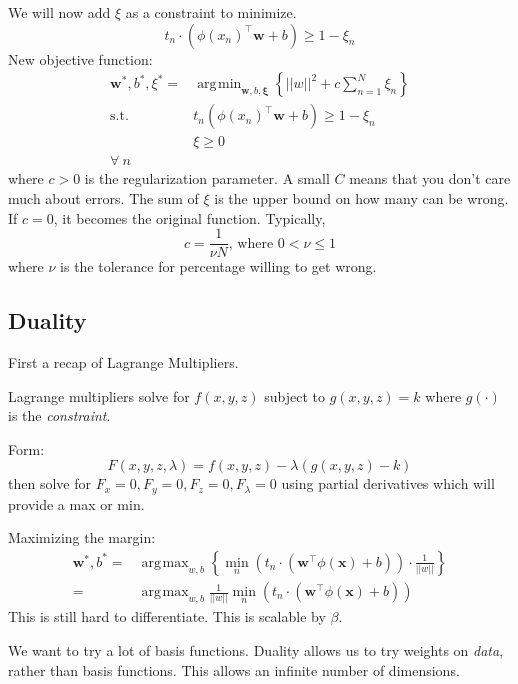 \documentclass[11pt, oneside]{article}   	%
\DeclareMathOperator*{\argmin}{\arg\!\min}
\DeclareMathOperator*{\argmax}{\arg\!\max}
\begin{document}
We will now add $\xi$ as a constraint to minimize.
\begin{equation}
t_n\cdot(\phi(x_n)^\intercal\mathbf{w}+b) \ge 1 - \xi_n
\end{equation}
New objective function:
\begin{align}
\mathbf{w}^*,b^*,\xi^*=& \argmin_{\mathbf{w},b,\mathbf{\xi}}\left\{||w||^2+ c \sum_{n=1}^{N}\xi_n\right\}\\
\text{s.t.} \:& t_n(\phi(x_n)^\intercal\mathbf{w} + b) \ge 1 -\xi_n\\
& \xi \ge 0\\
\forall \:n
\end{align}
where $c>0$ is the regularization parameter. A small $C$ means that you don't care much about errors. The sum of $\xi$ is the upper bound on how many can be wrong. If $c = 0$, it becomes the original function.
Typically,
\begin{equation}
c=\frac{1}{\nu N} \text{, where } 0 < \nu \le 1
\end{equation}
where $\nu$ is the tolerance for percentage willing to get wrong.

\subsection {Duality}
\begin{framed}
First a recap of Lagrange Multipliers.

Lagrange multipliers solve for $f(x,y,z)$ subject to $g(x,y,z) = k$ where $g(\cdot)$ is the \emph{constraint}.

Form:
\begin{equation}
F(x,y,z,\lambda) = f(x,y,z) - \lambda(g(x,y,z)-k)
\end{equation}
then solve for
$F_x = 0, F_y=0, F_z = 0, F_\lambda = 0$ using partial derivatives which will provide a max or min.
\end{framed}

Maximizing the margin:
\begin{align}
\mathbf{w}^*,b^*= &
\argmax_{w,b} \left\{\min_n(t_n\cdot(\mathbf{w}^\intercal\phi(\mathbf{x})+b))\cdot\frac{1}{||w||} \right\}\\
= &\argmax_{w,b} \frac{1}{||w||}\min_n(t_n\cdot(\mathbf{w}^\intercal\phi(\mathbf{x})+b))
\end{align}
This is still hard to differentiate. This is scalable by $\beta$.

We want to try a lot of basis functions. Duality allows us to try weights on \emph{data}, rather than basis functions. This allows an infinite number of dimensions. 
\end{document}
